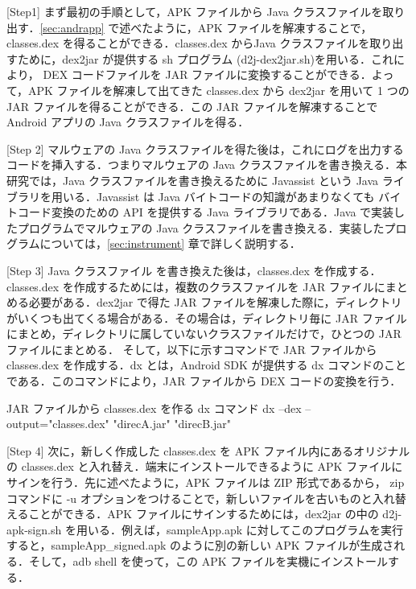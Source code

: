 [Step1] まず最初の手順として，APK ファイルから Java クラスファイルを取り出す．\ref{sec:andrapp} で述べたように，APK ファイルを解凍することで，classes.dex を得ることができる．classes.dex からJava クラスファイルを取り出すために，dex2jar \cite{d2jar} が提供する sh プログラム (d2j-dex2jar.sh)を用いる．これにより， DEX コードファイルを JAR ファイルに変換することができる．よって，APK ファイルを解凍して出てきた classes.dex から dex2jar を用いて 1 つの JAR ファイルを得ることができる．この JAR ファイルを解凍することで Android アプリの Java クラスファイルを得る．

[Step 2] マルウェアの Java クラスファイルを得た後は，これにログを出力するコードを挿入する．つまりマルウェアの Java クラスファイルを書き換える．本研究では，Java クラスファイルを書き換えるために Javassist \cite{javassist} という Java ライブラリを用いる．Javassist は Java バイトコードの知識があまりなくても バイトコード変換のための API を提供する Java ライブラリである．Java で実装したプログラムでマルウェアの Java クラスファイルを書き換える．実装したプログラムについては，\ref{sec:instrument} 章で詳しく説明する．

[Step 3] Java クラスファイル を書き換えた後は，classes.dex を作成する．classes.dex を作成するためには，複数のクラスファイルを JAR ファイルにまとめる必要がある．dex2jar で得た JAR ファイルを解凍した際に，ディレクトリがいくつも出てくる場合がある．その場合は，ディレクトリ毎に JAR ファイルにまとめ，ディレクトリに属していないクラスファイルだけで，ひとつの JAR ファイルにまとめる． そして，以下に示すコマンドで JAR ファイルから classes.dex を作成する．dx とは，Android SDK が提供する dx コマンドのことである．このコマンドにより，JAR ファイルから DEX コードの変換を行う．

\begin{itembox}[l]{JAR ファイルから classes.dex を作る dx コマンド}
	dx --dex --output="classes.dex" "direcA.jar" "direcB.jar" 
\end{itembox}

[Step 4] 次に，新しく作成した classes.dex を APK ファイル内にあるオリジナルの classes.dex と入れ替え．端末にインストールできるように APK ファイルにサインを行う．先に述べたように，APK ファイルは ZIP 形式であるから， zip コマンドに -u オプションをつけることで，新しいファイルを古いものと入れ替えることができる．APK ファイルにサインするためには，dex2jar の中の d2j-apk-sign.sh を用いる．例えば，sampleApp.apk に対してこのプログラムを実行すると，sampleApp\_signed.apk のように別の新しい APK ファイルが生成される．そして，adb shell を使って，この APK ファイルを実機にインストールする．

